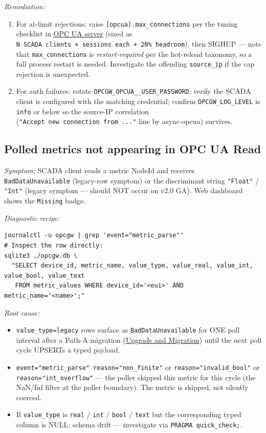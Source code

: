 \emph{Remediation:}

\begin{enumerate}
\def\labelenumi{\arabic{enumi}.}
\item
  For at-limit rejections: raise \texttt{{[}opcua{]}.max\_connections} per the tuning checklist in \hyperref[sec-opcua-config]{OPC UA server} (sized as \texttt{N\ SCADA\ clients\ ×\ sessions\ each\ +\ 20\%\ headroom}), then SIGHUP --- note that \texttt{max\_connections} is \emph{restart-required} per the hot-reload taxonomy, so a full process restart is needed. Investigate the offending \texttt{source\_ip} if the cap rejection is unexpected.
\item
  For auth failures: rotate \texttt{OPCGW\_OPCUA\_\_USER\_PASSWORD}; verify the SCADA client is configured with the matching credential; confirm \texttt{OPCGW\_LOG\_LEVEL} is \texttt{info} or below so the source-IP correlation (\texttt{"Accept\ new\ connection\ from\ ..."} line by async-opcua) survives.
\end{enumerate}

\subsection{Polled metrics not appearing in OPC UA Read}\label{sec-issue-metric-parse-legacy}

\emph{Symptom:} SCADA client reads a metric NodeId and receives \texttt{BadDataUnavailable} (legacy-row symptom) or the discriminant string \texttt{"Float"} / \texttt{"Int"} (legacy symptom --- should NOT occur on v2.0 GA). Web dashboard shows the \texttt{Missing} badge.

\emph{Diagnostic recipe:}

\begin{lstlisting}
journalctl -u opcgw | grep 'event="metric_parse"'
# Inspect the row directly:
sqlite3 ./opcgw.db \
  "SELECT device_id, metric_name, value_type, value_real, value_int, value_bool, value_text
   FROM metric_values WHERE device_id='<eui>' AND metric_name='<name>';"
\end{lstlisting}

\emph{Root cause:}

\begin{itemize}
\item
  \texttt{value\_type=\textquotesingle{}legacy\textquotesingle{}} rows surface as \texttt{BadDataUnavailable} for ONE poll interval after a Path-A migration (\hyperref[ch-upgrade]{Upgrade and Migration}) until the next poll cycle UPSERTs a typed payload.
\item
  \texttt{event="metric\_parse"\ reason="non\_finite"} or \texttt{reason="invalid\_bool"} or \texttt{reason="int\_overflow"} --- the poller skipped this metric for this cycle (the NaN/Inf filter at the poller boundary). The metric is skipped, not silently coerced.
\item
  If \texttt{value\_type} is \texttt{real} / \texttt{int} / \texttt{bool} / \texttt{text} but the corresponding typed column is NULL: schema drift --- investigate via \texttt{PRAGMA\ quick\_check;}.
\end{itemize}

